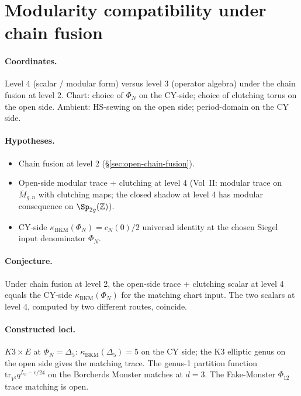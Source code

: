 \section{Modularity compatibility under chain fusion}
\label{sec:open-modularity-fusion}

\paragraph{Coordinates.} Level 4 (scalar / modular form) versus level 3
(operator algebra) under the chain fusion at level 2. Chart: choice of
$\Phi_N$ on the CY-side; choice of clutching torus on the open side.
Ambient: HS-sewing on the open side; period-domain on the CY side.

\paragraph{Hypotheses.}
\begin{itemize}[nosep]
\item Chain fusion at level 2 (\S\ref{sec:open-chain-fusion}).
\item Open-side modular trace + clutching at level 4 (Vol~II:
  modular trace on $\overline{M}_{g, n}$ with clutching maps; the
  closed shadow at level 4 has modular consequence on
  $\Sp_{2g}(\mathbb{Z})$).
\item CY-side $\kappa_{\mathrm{BKM}}(\Phi_N) = c_N(0)/2$ universal
  identity at the chosen Siegel input denominator $\Phi_N$.
\end{itemize}

\paragraph{Conjecture.} Under chain fusion at
level 2, the open-side trace + clutching scalar at level 4 equals the
CY-side $\kappa_{\mathrm{BKM}}(\Phi_N)$ for the matching chart input.
The two scalars at level 4, computed by two different routes,
coincide.

\paragraph{Constructed loci.} $K3 \times E$ at $\Phi_N = \Delta_5$:
$\kappa_{\mathrm{BKM}}(\Delta_5) = 5$ on the CY side; the K3 elliptic
genus on the open side gives the matching trace. The
genus-1 partition function $\mathrm{tr}_{V^\natural} q^{L_0 - c/24}$ on
the Borcherds Monster matches at $d = 3$. The Fake-Monster
$\Phi_{12}$ trace matching is open.

